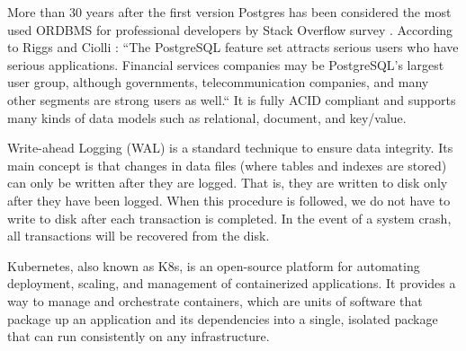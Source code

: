 More than 30 years after the first version Postgres has been considered the most used ORDBMS for professional developers by Stack Overflow survey \cite{so2022survey}. According to Riggs and Ciolli \cite{pg14introduction}: “The PostgreSQL feature set attracts serious users who have serious applications. Financial services companies may be PostgreSQL's largest user group, although governments, telecommunication companies, and many other segments are strong users as well.“ It is fully ACID compliant \cite{juba2015learningTransactionIsolation} and supports many kinds of data models such as relational, document, and key/value. \cite{pg14introduction}

Write-ahead Logging (WAL) is a standard technique to ensure data integrity. Its main concept is that changes in data files (where tables and indexes are stored) can only be written after they are logged. That is, they are written to disk only after they have been logged. When this procedure is followed, we do not have to write to disk after each transaction is completed. In the event of a system crash, all transactions will be recovered from the disk. \cite{docuPgWal}




Kubernetes, also known as K8s, is an open-source platform for automating deployment, scaling, and management of containerized applications. It provides a way to manage and orchestrate containers, which are units of software that package up an application and its dependencies into a single, isolated package that can run consistently on any infrastructure. \cite{vayghan2019kubernetes}

